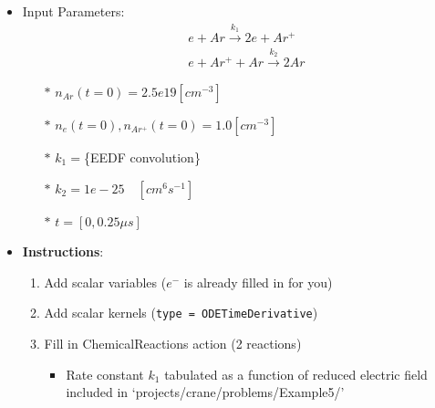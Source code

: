 \begin{frame}[fragile]
	\frametitle{\insertsubsectionhead}
	\begin{itemize}
		\item Input Parameters:
		\begin{align*}
				&e + Ar \xrightarrow{k_1} 2e + Ar^+  \\
				&e + Ar^+ + Ar \xrightarrow{k_2} 2Ar  
			\end{align*}
		\begin{itemize}
			\item[$\ast$] $n_{Ar}(t=0) = 2.5e19 [cm^{-3}]$
			\item[$\ast$] $n_{e}(t=0), n_{Ar^+}(t=0) = 1.0 [cm^{-3}]$
			\item[$\ast$] $k_1 = $\{EEDF convolution\}
			\item[$\ast$] $k_2 = 1e-25 \quad [cm^6 s^{-1}]$
			\item[$\ast$] $t=[0,0.25 \mu s]$
		\end{itemize}
		\item \textbf{Instructions}:
		\begin{enumerate}
			\item Add scalar variables ($e^-$ is already filled in for you)
			\item Add scalar kernels (\texttt{type = ODETimeDerivative})
			\item Fill in ChemicalReactions action (2 reactions)
			\begin{itemize}
				\item Rate constant $k_1$ tabulated as a function of reduced electric field included in `projects/crane/problems/Example5/'
			\end{itemize}
		\end{enumerate}
	\end{itemize}
\end{frame}

